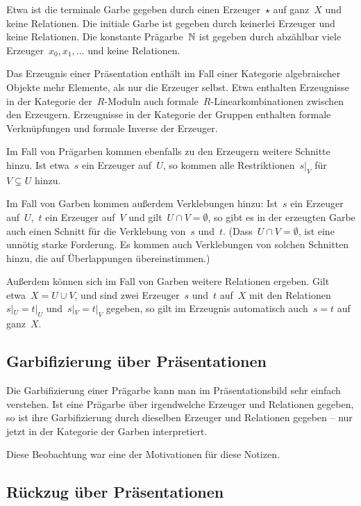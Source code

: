 \documentclass{uebblatt}
\begin{document}
Etwa ist die terminale Garbe gegeben durch einen Erzeuger~$\star$ auf ganz~$X$
und keine Relationen. Die initiale Garbe ist gegeben durch keinerlei Erzeuger
und keine Relationen. Die konstante Prägarbe~$\mathbb{N}$ ist gegeben durch abzählbar
viele Erzeuger~$x_0,x_1,\ldots$ und keine Relationen.

Das Erzeugnis einer Präsentation enthält im Fall einer Kategorie algebraischer
Objekte mehr Elemente, als nur die Erzeuger selbst. Etwa enthalten Erzeugnisse
in der Kategorie der~$R$-Moduln auch formale~$R$-Linearkombinationen zwischen
den Erzeugern. Erzeugnisse in der Kategorie der Gruppen enthalten formale
Verknüpfungen und formale Inverse der Erzeuger.

Im Fall von Prägarben kommen ebenfalls zu den Erzeugern weitere Schnitte hinzu.
Ist etwa~$s$ ein Erzeuger auf~$U$, so kommen alle Restriktionen~$s|_V$ für~$V
\subsetneq U$ hinzu.

Im Fall von Garben kommen außerdem Verklebungen hinzu: Ist~$s$ ein Erzeuger
auf~$U$,~$t$ ein Erzeuger auf~$V$ und gilt~$U \cap V = \emptyset$, so gibt es
in der erzeugten Garbe auch einen Schnitt für die Verklebung von~$s$ und~$t$.
(Dass~$U \cap V = \emptyset$, ist eine unnötig starke Forderung. Es kommen auch
Verklebungen von solchen Schnitten hinzu, die auf Überlappungen
übereinstimmen.)

Außerdem können sich im Fall von Garben weitere Relationen ergeben. Gilt
etwa~$X = U \cup V$, und sind zwei Erzeuger~$s$ und~$t$ auf~$X$ mit den
Relationen~$s|_U = t|_U$ und~$s|_V = t|_V$ gegeben, so gilt im Erzeugnis automatisch
auch~$s = t$ auf ganz~$X$.


\subsection*{Garbifizierung über Präsentationen}

Die Garbifizierung einer Prägarbe kann man im Präsentationsbild sehr einfach
verstehen. Ist eine Prägarbe über irgendwelche Erzeuger und Relationen gegeben,
so ist ihre Garbifizierung durch dieselben Erzeuger und Relationen gegeben --
nur jetzt in der Kategorie der Garben interpretiert.

Diese Beobachtung war eine der Motivationen für diese Notizen.


\subsection*{Rückzug über Präsentationen}
\end{document}
